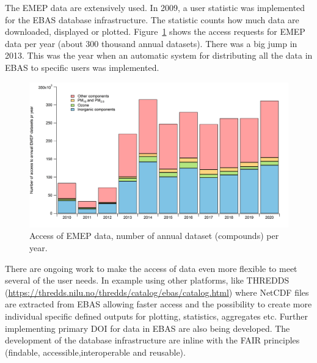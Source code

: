 The EMEP data are extensively used. In 2009, a user statistic was implemented for the EBAS database infrastructure.  
The statistic counts how much data are downloaded, displayed or plotted. Figure~\ref{fig:downloads} shows the access requests for EMEP data per year (about 300 thousand annual datasets). There was a big jump in 2013. This was the year when an automatic system for distributing all the data in EBAS to specific users was implemented.

\begin{figure}[h]
\centering
\includegraphics[width=0.6\paperwidth]{FIGS_Obs/downloaded.png}
\caption{\label{fig:downloads}Access of EMEP data, number of annual dataset (compounds) per year.}
 \end{figure}

There are ongoing work to make the  access of data even more flexible to meet several of the user needs. In example using other platforms, like THREDDS (\url{https://thredds.nilu.no/thredds/catalog/ebas/catalog.html}) where NetCDF files are extracted from EBAS allowing faster access and the possibility to create more individual specific defined outputs for plotting, statistics, aggregates etc. Further implementing primary DOI for data in EBAS are also being developed. The development of the database infrastructure are inline with the FAIR principles (findable, accessible,interoperable and reusable).

\clearpage
\renewcommand\bibname{References}      %

